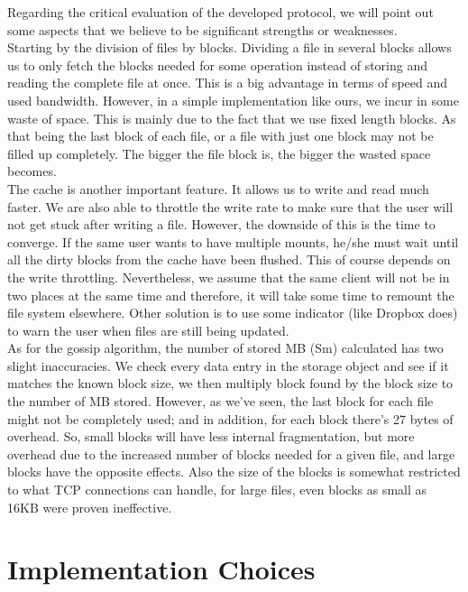 \documentclass[times,9pt,article]{llncs}
\begin{document}
Regarding the critical evaluation of the developed protocol, we will point out some aspects that we believe to be significant strengths or weaknesses.\\
Starting by the division of files by blocks. Dividing a file in several blocks allows us to only fetch the blocks needed for some operation instead of storing and reading the complete file at once. This is a big advantage in terms of speed and used bandwidth. However, in a simple implementation like ours, we incur in some waste of space. This is mainly due to the fact that we use fixed length blocks. As that being the last block of each file, or a file with just one block may not be filled up completely. The bigger the file block is, the bigger the wasted space becomes.\\
The cache is another important feature. It allows us to write and read much faster. We are also able to throttle the write rate to make sure that the user will not get stuck after writing a file. However, the downside of this is the time to converge. If the same user wants to have multiple mounts, he/she must wait until all the dirty blocks from the cache have been flushed. This of course depends on the write throttling. Nevertheless, we assume that the same client will not be in two places at the same time and therefore, it will take some time to remount the file system elsewhere. Other solution is to use some indicator (like Dropbox does) to warn the user when files are still being updated. \\
As for the gossip algorithm, the number of stored MB (Sm) calculated has two slight inaccuracies. We check every data entry in the storage object and see if it matches the known block size, we then multiply block found by the block size to the number of MB stored. However, as we've seen, the last block for each file might not be completely used; and in addition, for each block there's 27 bytes of overhead. So, small blocks will have less internal fragmentation, but more overhead due to the increased number of blocks needed for a given file, and large blocks have the opposite effects. Also the size of the blocks is somewhat restricted to what TCP connections can handle, for large files, even blocks as small as 16KB were proven ineffective.

\section{Implementation Choices}
\end{document}
